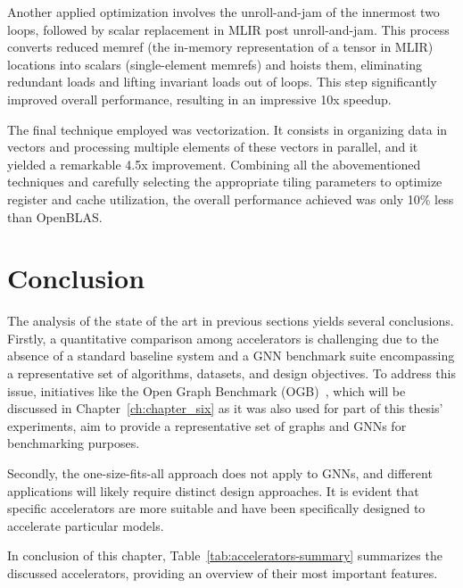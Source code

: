 Another applied optimization involves the unroll-and-jam of the innermost two loops, followed by scalar replacement in MLIR post unroll-and-jam.
This process converts reduced memref (the in-memory representation of a tensor in MLIR) locations into scalars (single-element memrefs) and hoists them, eliminating redundant loads and lifting invariant loads out of loops.
This step significantly improved overall performance, resulting in an impressive 10x speedup.

The final technique employed was vectorization.
It consists in organizing data in vectors and processing multiple elements of these vectors in parallel, and it yielded a remarkable 4.5x improvement.
Combining all the abovementioned techniques and carefully selecting the appropriate tiling parameters to optimize register and cache utilization, the overall performance achieved was only 10\% less than OpenBLAS.

\section{Conclusion}
\label{sec:relater-work-conclusion}

The analysis of the state of the art in previous sections yields several conclusions.
Firstly, a quantitative comparison among accelerators is challenging due to the absence of a standard baseline system and a GNN benchmark suite encompassing a representative set of algorithms, datasets, and design objectives.
To address this issue, initiatives like the Open Graph Benchmark (OGB)~\cite{NEURIPS2020_fb60d411}, which will be discussed in Chapter~\ref{ch:chapter_six} as it was also used for part of this thesis' experiments, aim to provide a representative set of graphs and GNNs for benchmarking purposes.

Secondly, the one-size-fits-all approach does not apply to GNNs, and different applications will likely require distinct design approaches.
It is evident that specific accelerators are more suitable and have been specifically designed to accelerate particular models.

In conclusion of this chapter, Table~\ref{tab:accelerators-summary} summarizes the discussed accelerators, providing an overview of their most important features.

